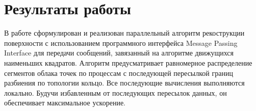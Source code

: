 
\section{Результаты работы}

В работе сформулирован и реализован параллельный алгоритм рекострукции поверхности с использованием программного интерфейса Message Passing Interface для передачи сообщений, завязанный на алгоритме движущихся наименьших квадратов. Алгоритм предусматривает равномерное распределение сегментов облака точек по процессам с последующей пересылкой границ разбиения по топологии кольцо. Все последующие вычисления выполняются локально. Будучи избавленным от последующих пересылок данных, он обеспечивает максимальное ускорение. 